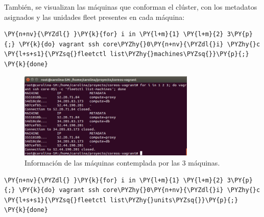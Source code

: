 También, se visualizan las máquinas que conforman el clúster, con los metadatos asignados y las unidades fleet presentes en cada máquina:

\begin{framed_shaded}
\begin{Verbatim}[fontsize=\relsize{-2.5},fontseries=b,commandchars=\\\{\}]
\PY{n+nv}{\PYZdl{} }\PY{k}{for} i in \PY{l+m}{1} \PY{l+m}{2} 3\PY{p}{;} \PY{k}{do} vagrant ssh core\PYZhy{}0\PY{n+nv}{\PYZdl{}i} \PYZhy{}c \PY{l+s+s1}{\PYZsq{}fleetctl list\PYZhy{}machines\PYZsq{}}\PY{p}{;} \PY{k}{done}
\end{Verbatim}
\end{framed_shaded}

\begin{figure}[H]
\centering
\includegraphics[width=0.75\textwidth]{images/figures/machines-confd.png}
\caption{Información de las máquinas contemplada por las 3 máquinas.}
\end{figure}

\begin{framed_shaded}
\begin{Verbatim}[fontsize=\relsize{-2.5},fontseries=b,commandchars=\\\{\}]
\PY{n+nv}{\PYZdl{} }\PY{k}{for} i in \PY{l+m}{1} \PY{l+m}{2} 3\PY{p}{;} \PY{k}{do} vagrant ssh core\PYZhy{}0\PY{n+nv}{\PYZdl{}i} \PYZhy{}c \PY{l+s+s1}{\PYZsq{}fleetctl list\PYZhy{}units\PYZsq{}}\PY{p}{;} \PY{k}{done}
\end{Verbatim}
\end{framed_shaded}


